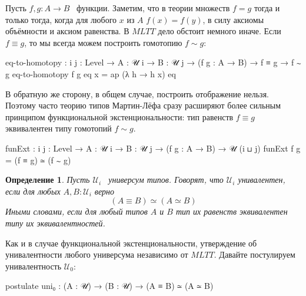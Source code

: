 \documentclass{article}[12pt]
\newtheorem{definition}{Определение}
\newcommand{\dash}{\textemdash\ }
\begin{document}
Пусть $f, g : A \rightarrow B$ \dash функции. Заметим, что в теории множеств $f = g$ тогда и только тогда,
когда для любого $x$ из $A$ $f(x) = f(y)$, в силу аксиомы объёмности и аксиом равенства. В $MLTT$ дело
обстоит немного иначе. Если $f \equiv g$, то мы всегда можем построить гомотопию $f \sim g$:
\begin{code}
eq-to-homotopy : {i j : Level} → {A : 𝒰 i} → {B : 𝒰 j}
               → (f g : A → B)
               → f ≡ g
               → f ∼ g
eq-to-homotopy f g eq x = ap (λ h → h x) eq
\end{code}
В обратную же сторону, в общем случае, построить отображение нельзя. Поэтому часто
теорию типов Мартин-Лёфа сразу расширяют более сильным принципом функциональной экстенциональности:
тип равенств $f \equiv g$ эквивалентен типу гомотопий $f \sim g$.
\begin{code}
funExt : {i j : Level} → {A : 𝒰 i} → {B : 𝒰 j}
         → (f g : A → B)
         → 𝒰 (i ⊔ j)
funExt f g = (f ≡ g) ≃ (f ∼ g)
\end{code}

\begin{definition}
    \label{UnivalenceDefinition}
    Пусть $\mathcal U_i$ \dash универсум типов. Говорят, что $\mathcal U_i$ унивалентен,
    если для любых $A, B : \mathcal U_i$ верно
    $$(A \equiv B) \simeq (A \simeq B)$$
    Иными словами, если для любый типов $A$ и $B$ тип их равенств эквивалентен типу их
    эквивалентностей.
\end{definition}

Как и в случае функциональной экстенциональности, утверждение об унивалентности любого универсума
независимо от  $MLTT$. Давайте постулируем унивалентность $\mathcal U_0$:
\begin{code}
postulate
    uni₀ : (A : 𝒰) → (B : 𝒰)
           → (A ≡ B) ≃ (A ≃ B)
\end{code}
\end{document}
